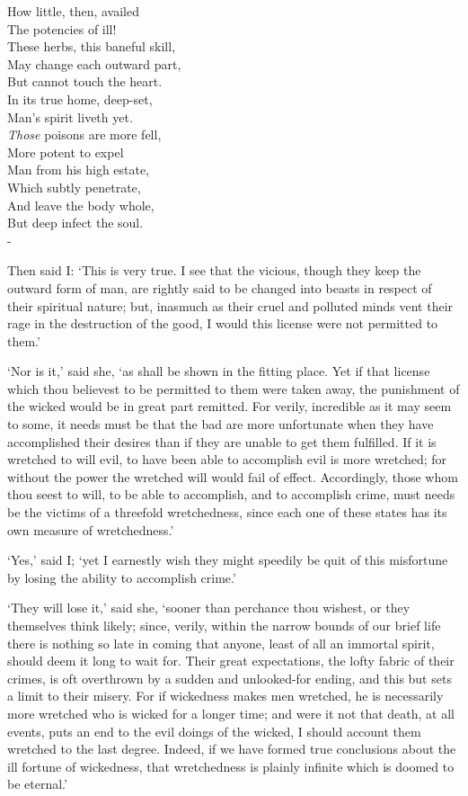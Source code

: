 \documentclass[12pt]{book}
\newenvironment{ipoem}[1]%
  {\setcounter{poemindentevery}{#1}\begin{poem}\small}%
  {\end{poem}\setcounter{poemindentevery}{0}}
\begin{document}
\begin{ipoem}{0}
    How little, then, availed \\
    The potencies of ill! \\
    These herbs, this baneful skill, \\
    May change each outward part, \\
    But cannot touch the heart. \\
    In its true home, deep-set, \\
    Man's spirit liveth yet. \\
    \emph{Those} poisons are more fell, \\
    More potent to expel \\
    Man from his high estate, \\
    Which subtly penetrate, \\
    And leave the body whole, \\
    But deep infect the soul. \\-
\end{ipoem}


Then said I: `This is very true. I see that the vicious, though they
keep the outward form of man, are rightly said to be changed into beasts
in respect of their spiritual nature; but, inasmuch as their cruel and
polluted minds vent their rage in the destruction of the good, I would
this license were not permitted to them.'

`Nor is it,' said she, `as shall be shown in the fitting place. Yet if
that license which thou believest to be permitted to them were taken
away, the punishment of the wicked would be in great part remitted. For
verily, incredible as it may seem to some, it needs must be that the bad
are more unfortunate when they have accomplished their desires than if
they are unable to get them fulfilled. If it is wretched to will evil,
to have been able to accomplish evil is more wretched; for without the
power the wretched will would fail of effect. Accordingly, those whom
thou seest to will, to be able to accomplish, and to accomplish crime,
must needs be the victims of a threefold wretchedness, since each one of
these states has its own measure of wretchedness.'

`Yes,' said I; `yet I earnestly wish they might speedily be quit of this
misfortune by losing the ability to accomplish crime.'

`They will lose it,' said she, `sooner than perchance thou wishest, or
they themselves think likely; since, verily, within the narrow bounds of
our brief life there is nothing so late in coming that anyone, least of
all an immortal spirit, should deem it long to wait for. Their great
expectations, the lofty fabric of their crimes, is oft overthrown by a
sudden and unlooked-for ending, and this but sets a limit to their
misery. For if wickedness makes men wretched, he is necessarily more
wretched who is wicked for a longer time; and were it not that death, at
all events, puts an end to the evil doings of the wicked, I should
account them wretched to the last degree. Indeed, if we have formed true
conclusions about the ill fortune of wickedness, that wretchedness is
plainly infinite which is doomed to be eternal.'
\end{document}
